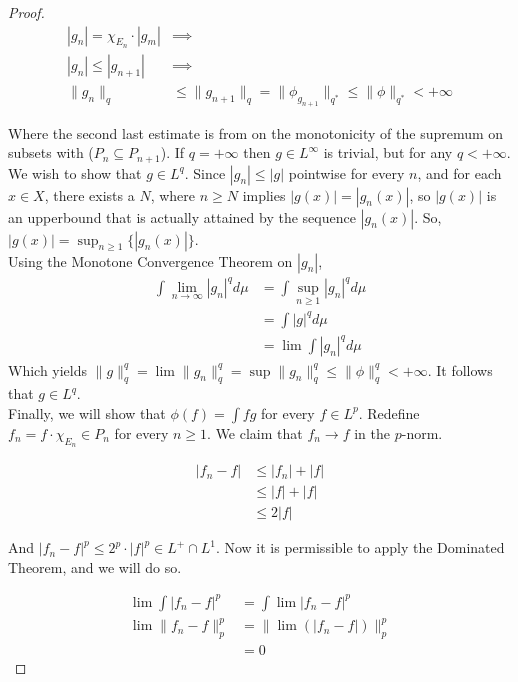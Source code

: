 \documentclass[../../main.tex]{subfiles}
\begin{document}
\begin{proof}
\begin{align*}
    |g_n| = \chi_{E_n}\cdot |g_m|&\implies \\
    |g_n| \leq |g_{n+1}|&\implies \\
    \lVert g_n \rVert_q
    &\leq\lVert g_{n+1} \rVert_q = \lVert \phi_{g_{n+1}} \rVert_{q^*}
    \leq \lVert \phi \rVert_{q^*}
    < +\infty
\end{align*}



Where the second last estimate is from on the monotonicity of the supremum on subsets with ($P_n\subseteq P_{n+1}$). If $q = +\infty$ then $g\in L^\infty$ is trivial, but for any $q<+\infty$. We wish to show that $g\in L^q$. Since $|g_n|\leq |g|$ pointwise for every $n$, and for each $x\in X$, there exists a $N$, where $n\geq N$ implies $|g(x)| = |g_n(x)|$, so $|g(x)|$ is an upperbound that is actually attained by the sequence $|g_n(x)|$. So, $|g(x)| = \sup_{n\geq 1}\{|g_n(x)|\}$. \\

Using the Monotone Convergence Theorem on $|g_n|$, 
\begin{align*}
    \int \lim_{n\to\infty} |g_n|^q d\mu &= \int\sup_{n\geq 1}|g_n|^q d\mu\\
    &= \int |g|^qd\mu\\
    &= \lim \int |g_n|^q d\mu
\end{align*}
Which yields $\lVert g \rVert^q_q = \lim \lVert g_n \rVert^q_q = \sup \lVert g_n \rVert^q_q \leq \lVert \phi \rVert^q_q < +\infty$. It follows that $g\in L^q$.\\

Finally, we will show that $\phi(f) = \int fg$ for every $f\in L^p$. Redefine $f_n = f\cdot\chi_{E_n} \in P_n$ for every $n\geq 1$. We claim that $f_n \to f$ in the $p$-norm.


\begin{align*}
    |f_n - f| &\leq |f_n| + |f|\\
    &\leq |f| + |f|\\
    &\leq 2|f|
\end{align*}

And $|f_n -f|^p \leq 2^p\cdot |f|^p \in L^+\cap L^1$. Now it is permissible to apply the Dominated Theorem, and we will do so.

\begin{align*}
    \lim \int |f_n -f|^p &= \int \lim |f_n-f|^p\\
    \lim \lVert f_n -f \rVert^p_p &= \lVert \lim (|f_n - f|) \rVert^p_p\\
    &= 0
\end{align*}


\end{proof}
\end{document}
